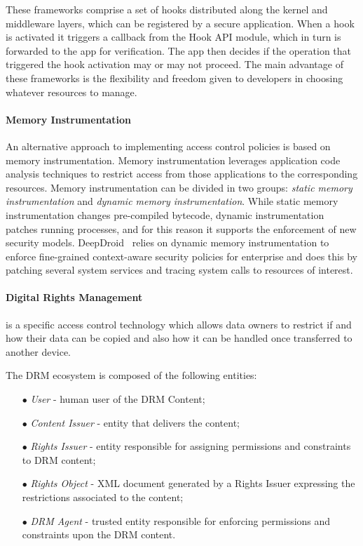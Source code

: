 These frameworks comprise a set of hooks distributed along the kernel and middleware layers, which can be registered by a secure application. When a hook is activated it triggers a callback from the Hook API module, which in turn is forwarded to the app for verification. The app then decides if the operation that triggered the hook activation may or may not proceed. The main advantage of these frameworks is the flexibility and freedom given to developers in choosing whatever resources to manage.

\paragraph{\textbf{Memory Instrumentation}}

An alternative approach to implementing access control policies is based on memory instrumentation. Memory instrumentation leverages application code analysis techniques to restrict access from those applications to the corresponding resources. Memory instrumentation can be divided in two groups: \emph{static memory instrumentation} and \emph{dynamic memory instrumentation}. While static memory instrumentation changes pre-compiled bytecode, dynamic instrumentation patches running processes, and for this reason it supports the enforcement of new security models. DeepDroid~\cite{wang2015deepdroid} relies on dynamic memory instrumentation to enforce fine-grained context-aware security policies for enterprise and does this by patching several system services and tracing system calls to resources of interest.

\paragraph{\textbf{Digital Rights Management}} is a specific access control technology which allows data owners to restrict if and how their data can be copied and also how it can be handled once transferred to another device.

The \ac{DRM} ecosystem is composed of the following entities:

\begin{itemize}
	\item[$\bullet$] \emph{User} - human user of the DRM Content;
	\item[$\bullet$] \emph{Content Issuer} - entity that delivers the content;
	\item[$\bullet$] \emph{Rights Issuer} - entity responsible for assigning permissions and constraints to \ac{DRM} content;
	\item[$\bullet$] \emph{Rights Object} - XML document generated by a Rights Issuer expressing the restrictions associated to the content;
	\item[$\bullet$] \emph{\ac{DRM} Agent} - trusted entity responsible for enforcing permissions and constraints upon the \ac{DRM} content.
\end{itemize}

